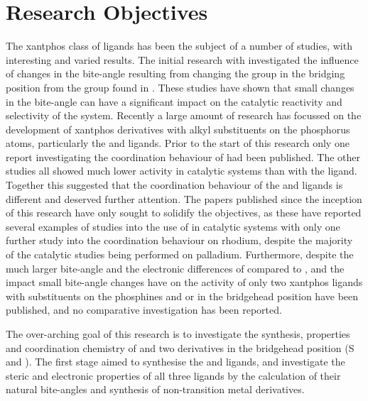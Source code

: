 \section{Research Objectives}

The xantphos class of ligands has been the subject of a number of studies, with interesting and varied results.  The initial research with \Phxantphos{} investigated the influence of changes in the bite-angle resulting from changing the group in the bridging position from the  group found in \Phxantphos.\cite{Kranenburg1995, Kranenburg1998, Kamer2001}  These studies have shown that small changes in the bite-angle can have a significant impact on the catalytic reactivity and selectivity of the system.  Recently a large amount of research has focussed on the development of xantphos derivatives with alkyl substituents on the phosphorus atoms, particularly the \iPrxantphos{} and \tBuxantphos{} ligands.  Prior to the start of this research only one report investigating the coordination behaviour of \tBuxantphos{} had been published.\cite{Partyka2010}  The other studies all showed much lower activity in catalytic systems than with the \Phxantphos{} ligand.\cite{Ohshima2009, Mispelaere2005, Dongol2007}   Together this suggested that the coordination behaviour of the \tBuxantphos{} and \Phxantphos{} ligands is different and deserved further attention.  The papers published since the inception of this research have only sought to solidify the objectives, as these have reported several examples of studies into the use of \tBuxantphos{} in catalytic systems with only one further study into the coordination behaviour on rhodium, despite the majority of the catalytic studies being performed on palladium.  Furthermore, despite the much larger bite-angle and the electronic differences of \tBuxantphos{} compared to \Phxantphos, and the impact small bite-angle changes have on the activity of \Phxantphos{} only two xantphos ligands with \tBu{} substituents on the phosphines and  or  in the bridgehead position have been published, and no comparative investigation has been reported.

The over-arching goal of this research is to investigate the synthesis, properties and coordination chemistry of \tBuxantphos{} and two derivatives in the bridgehead position (S and ).  The first stage aimed to synthesise the \tButhixantphos{} and \tBusixantphos{} ligands, and investigate the steric and electronic properties of all three \tBuxantphos{} ligands by the calculation of their natural bite-angles and synthesis of non-transition metal derivatives.  

